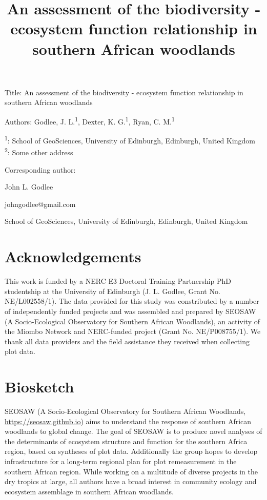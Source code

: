 \documentclass[11pt,a4paper]{article}
\title{An assessment of the biodiversity - ecosystem function relationship in southern African woodlands}
\author{}
\date{}
\begin{document}
{\LARGE{Title: An assessment of the biodiversity - ecosystem function relationship in southern African woodlands}}

\vspace{1cm}

Authors: Godlee, J. L.\textsuperscript{1}, Dexter, K. G.\textsuperscript{1}, Ryan, C. M.\textsuperscript{1}

\textsuperscript{1}: School of GeoSciences, University of Edinburgh, Edinburgh, United Kingdom \\
\textsuperscript{2}: Some other address

\vspace{1em}
Corresponding author:

John L. Godlee

johngodlee@gmail.com

School of GeoSciences, University of Edinburgh, Edinburgh, United Kingdom


\section{Acknowledgements}

This work is funded by a NERC E3 Doctoral Training Partnership PhD studentship at the University of Edinburgh (J. L. Godlee, Grant No. NE/L002558/1). The data provided for this study was constributed by a number of independently funded projects and was assembled and prepared by SEOSAW (A Socio-Ecological Observatory for Southern African Woodlands), an activity of the Miombo Network and NERC-funded project (Grant No. NE/P008755/1). We thank all data providers and the field assistance they received when collecting plot data. 

\section{Biosketch}

SEOSAW (A Socio-Ecological Observatory for Southern African Woodlands, \url{https://seosaw.github.io}) aims to understand the response of southern African woodlands to global change. The goal of SEOSAW is to produce novel analyses of the determinants of ecosystem structure and function for the southern Africa region, based on syntheses of plot data. Additionally the group hopes to develop infrastructure for a long-term regional plan for plot remeasurement in the southern African region. While working on a multitude of diverse projects in the dry tropics at large, all authors have a broad interest in community ecology and ecosystem assemblage in southern African woodlands.
\end{document}
